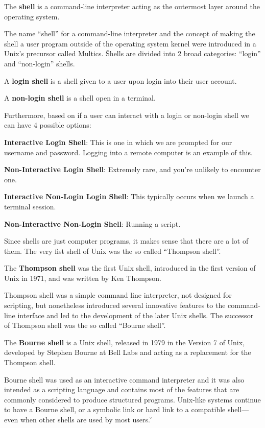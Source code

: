 \bd[Shell]
The \textbf{shell} is a command-line interpreter acting as the outermost layer around the operating system.
\ed

The name ``shell'' for a command-line interpreter and the concept of making the shell a user program outside of the
operating system kernel were introduced in a Unix's precursor called Multics. \v

Shells are divided into 2 broad categories: ``login'' and ``non-login'' shells.

A \textbf{login shell} is a shell given to a user upon login into their user account.
\ed

A \textbf{non-login shell} is a shell open in a terminal.
\ed

Furthermore, based on if a user can interact with a login or non-login shell we can have 4 possible options:
\bit
\item \textbf{Interactive Login Shell}: This is one in which we are prompted for our username and password. Logging into
a remote computer is an example of this.
\item \textbf{Non-Interactive Login Shell}: Extremely rare, and you're unlikely to encounter one.
\item \textbf{Interactive Non-Login Login Shell}: This typically occurs when we launch a terminal session.
\item \textbf{Non-Interactive Non-Login Shell}: Running a script.
\eit

Since shells are just computer programs, it makes sense that there are a lot of them. The very fist shell of Unix was
the so called ``Thompson shell''.

The \textbf{Thompson shell} was the first Unix shell, introduced in the first version of Unix in 1971, and was written
by Ken Thompson.
\ed

Thompson shell was a simple command line interpreter, not designed for scripting, but nonetheless introduced several
innovative features to the command-line interface and led to the development of the later Unix shells. The successor of
Thompson shell was the so called ``Bourne shell''.

The \textbf{Bourne shell} is a Unix shell, released in 1979 in the Version 7 of Unix, developed by Stephen Bourne at
Bell Labs and acting as a replacement for the Thompson shell.
\ed

Bourne shell was used as an interactive command interpreter and it was also intended as a scripting language and
contains most of the features that are commonly considered to produce structured programs. Unix-like systems continue
to have a Bourne shell, or a symbolic link or hard link to a compatible shell—even when other shells are used by
most users. \v

